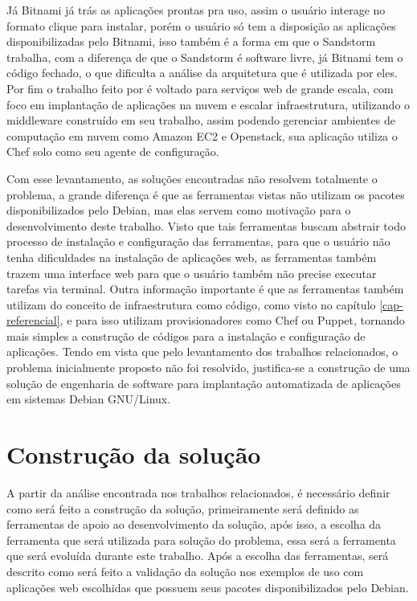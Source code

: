 Já Bitnami já trás as aplicações
prontas pra uso, assim o usuário interage no formato clique para instalar, porém
o usuário só tem a disposição as aplicações disponibilizadas pelo Bitnami, isso
também é a forma em que o Sandstorm trabalha, com a diferença de que o Sandstorm é
software livre, já Bitnami tem o código fechado, o que dificulta a análise da arquitetura
que é utilizada por eles. Por fim o trabalho feito por \cite{leo2014} é voltado
para serviços web de grande escala, com foco em implantação de aplicações na
nuvem e escalar infraestrutura, utilizando o middleware construído em seu trabalho,
 assim podendo gerenciar ambientes de computação em nuvem
 como Amazon EC2 e Openstack, sua aplicação utiliza o Chef solo como seu agente de configuração.

Com esse levantamento, as soluções encontradas não resolvem totalmente
o problema, a grande diferença é que as ferramentas vistas não utilizam os pacotes
disponibilizados pelo Debian, mas elas servem como motivação para o desenvolvimento
deste trabalho. Visto que tais ferramentas buscam
abstrair todo processo de instalação e configuração das ferramentas, para que o
usuário não tenha dificuldades na instalação de aplicações web, as ferramentas também
trazem uma interface web para que o usuário também não precise executar tarefas via terminal.
Outra informação importante é que as ferramentas também utilizam do conceito de
infraestrutura como código, como visto no capítulo \ref{cap-referencial}, e para
isso utilizam provisionadores como Chef ou Puppet, tornando mais simples a
construção de códigos para a instalação e configuração de aplicações.
Tendo em vista que pelo levantamento dos trabalhos relacionados, o problema inicialmente
proposto não foi resolvido, justifica-se a construção de uma solução de engenharia
de software para implantação automatizada de aplicações em sistemas Debian GNU/Linux.

\section{Construção da solução}
\label{section:construcao}

A partir da análise encontrada nos trabalhos relacionados, é necessário definir
como será feito a construção da solução, primeiramente será definido as ferramentas
de apoio ao desenvolvimento da solução, após isso, a escolha da ferramenta que será
utilizada para solução do problema, essa será a ferramenta que será evoluída
durante este trabalho. Após a escolha das ferramentas, será descrito como será
feito a validação da solução nos exemplos de uso com aplicações web escolhidas que possuem
seus pacotes disponibilizados pelo Debian.

